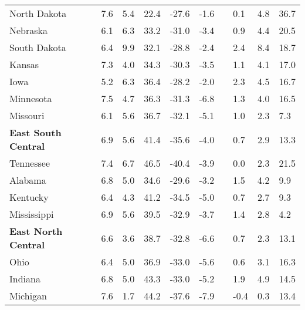 {\begin{tabular}{p{30mm} R{7mm} R{7mm} R{7mm} R{7mm} 
             R{7mm} p{0mm} R{9mm} R{9mm} R{10mm} }
\hspace{3mm}  North Dakota  & 7.6 & 5.4 & 22.4 & -27.6 & -1.6 &  & 0.1 & 4.8 & 36.7 \\
\hspace{3mm}  Nebraska  & 6.1 & 6.3 & 33.2 & -31.0 & -3.4 &  & 0.9 & 4.4 & 20.5 \\
\hspace{3mm}  South Dakota  & 6.4 & 9.9 & 32.1 & -28.8 & -2.4 &  & 2.4 & 8.4 & 18.7 \\
\hspace{3mm}  Kansas  & 7.3 & 4.0 & 34.3 & -30.3 & -3.5 &  & 1.1 & 4.1 & 17.0 \\
\hspace{3mm}  Iowa  & 5.2 & 6.3 & 36.4 & -28.2 & -2.0 &  & 2.3 & 4.5 & 16.7 \\
\hspace{3mm}  Minnesota  & 7.5 & 4.7 & 36.3 & -31.3 & -6.8 &  & 1.3 & 4.0 & 16.5 \\
\hspace{3mm}  Missouri  & 6.1 & 5.6 & 36.7 & -32.1 & -5.1 &  & 1.0 & 2.3 & 7.3 \\
\hspace{1mm} \textbf{East South Central}  & 6.9 & 5.6 & 41.4 & -35.6 & -4.0 &  & 0.7 & 2.9 & 13.3 \\
\hspace{3mm}  Tennessee  & 7.4 & 6.7 & 46.5 & -40.4 & -3.9 &  & 0.0 & 2.3 & 21.5 \\
\hspace{3mm}  Alabama  & 6.8 & 5.0 & 34.6 & -29.6 & -3.2 &  & 1.5 & 4.2 & 9.9 \\
\hspace{3mm}  Kentucky  & 6.4 & 4.3 & 41.2 & -34.5 & -5.0 &  & 0.7 & 2.7 & 9.3 \\
\hspace{3mm}  Mississippi  & 6.9 & 5.6 & 39.5 & -32.9 & -3.7 &  & 1.4 & 2.8 & 4.2 \\
\hspace{1mm} \textbf{East North Central}  & 6.6 & 3.6 & 38.7 & -32.8 & -6.6 &  & 0.7 & 2.3 & 13.1 \\
\hspace{3mm}  Ohio  & 6.4 & 5.0 & 36.9 & -33.0 & -5.6 &  & 0.6 & 3.1 & 16.3 \\
\hspace{3mm}  Indiana  & 6.8 & 5.0 & 43.3 & -33.0 & -5.2 &  & 1.9 & 4.9 & 14.5 \\
\hspace{3mm}  Michigan  & 7.6 & 1.7 & 44.2 & -37.6 & -7.9 &  & -0.4 & 0.3 & 13.4 \\

\end{tabular}}
